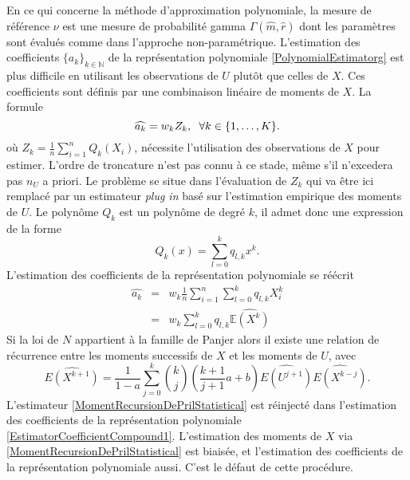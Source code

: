 En ce qui concerne la méthode d'approximation polynomiale, la mesure de référence $\nu$ est une mesure de probabilité gamma $\Gamma(\widehat{m},\widehat{r})$ dont les paramètres sont évalués comme dans l'approche non-paramétrique. L'estimation des coefficients $\{a_{k}\}_{k\in\mathbb{N}}$ de la représentation polynomiale \eqref{PolynomialEstimatorg} est plus difficile en utilisant les observations de $U$ plutôt que celles de $X$. Ces coefficients sont définis par une combinaison linéaire de moments de $X$. La formule 
\begin{equation}\label{EstimatorCoefficientCompound}
\widehat{a_{k}}=w_{k}Z_{k}, \hspace{0.2cm}\forall k\in\{1,\ldots,K\}.
\end{equation}
où $Z_{k}=\frac{1}{n}\sum_{i=1}^{n}Q_{k}(X_{i})$, nécessite l'utilisation des observations de $X$ pour estimer. L'ordre de troncature n'est pas connu à ce stade, même s\rq{}il n'excedera pas $n_{U}$ a priori. Le problème se situe dans l\rq{}évaluation de $Z_{k}$ qui va être ici remplacé par un estimateur \textit{plug in} basé sur l\rq{}estimation empirique des moments de $U$. Le polynôme $Q_{k}$ est un polynôme de degré $k$, il admet donc une expression de la forme 
\begin{equation}\label{PolynomialoDegreek}
Q_{k}(x)=\sum_{l=0}^{k}q_{l,k}x^{k}.
\end{equation}
L'estimation des coefficients de la représentation polynomiale se réécrit
\begin{eqnarray}
\widehat{a_{k}}&=&w_{k}\frac{1}{n}\sum_{i=1}^{n}\sum_{l=0}^{k}q_{l,k}X_{i}^{k}\nonumber\\
&=&w_{k}\sum_{l=0}^{k}q_{l,k}\widehat{\mathbb{E}\left(X^{k}\right)}\label{EstimatorCoefficientCompound1}
\end{eqnarray}
Si la loi de $N$ appartient à la famille de Panjer alors il existe une relation de récurrence entre les moments successifs de $X$ et les moments de $U$, avec
\begin{equation}\label{MomentRecursionDePrilStatistical}
\widehat{E\left(X^{k+1}\right)}=\frac{1}{1-a}\sum_{j=0}^{k}\binom{k}{j}\left(\frac{k+1}{j+1}a+b\right)\widehat{E\left(U^{j+1}\right)}\widehat{E\left(X^{k-j}\right)}.
\end{equation}
L'estimateur \eqref{MomentRecursionDePrilStatistical} est réinjecté dans l'estimation des coefficients de la représentation polynomiale \eqref{EstimatorCoefficientCompound1}. L'estimation des moments de $X$ via \eqref{MomentRecursionDePrilStatistical} est biaisée, et l'estimation des coefficients de la représentation polynomiale aussi. C'est le défaut de cette procédure.\\

